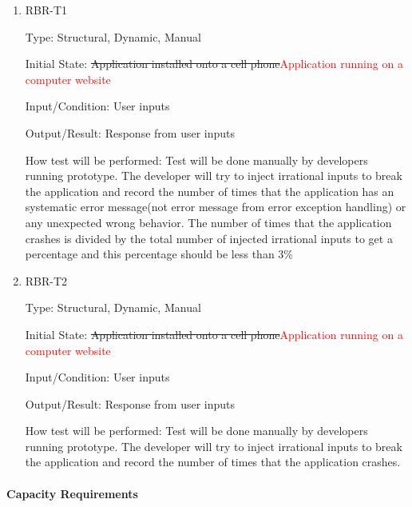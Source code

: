 \documentclass[12pt, titlepage]{article}
\begin{document}
\begin{enumerate}

\item{RBR-T1\\}

Type: Structural, Dynamic, Manual
					
Initial State: \sout{Application installed onto a cell phone}\textcolor{red}{Application running on a computer website}
					
Input/Condition: User inputs
					
Output/Result: Response from user inputs
					
How test will be performed: Test will be done manually by developers running prototype. The developer will try to inject irrational inputs to break the application and record the number of times that the application has an systematic error message(not error message from error exception handling) or any unexpected wrong behavior. The number of times that the application crashes is divided by the total number of injected irrational inputs to get a percentage and this percentage should be less than 3\%
					
\item{RBR-T2\\}

Type: Structural, Dynamic, Manual
					
Initial State: \sout{Application installed onto a cell phone}\textcolor{red}{Application running on a computer website}
					
Input/Condition: User inputs
					
Output/Result: Response from user inputs
					
How test will be performed: Test will be done manually by developers running prototype. The developer will try to inject irrational inputs to break the application and record the number of times that the application crashes.

\end{enumerate}

\paragraph{Capacity Requirements}
\end{document}
